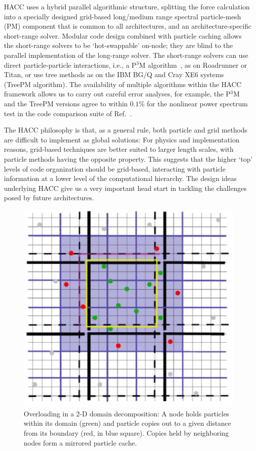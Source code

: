 HACC uses a hybrid parallel algorithmic structure, splitting the force
calculation into a specially designed grid-based long/medium range
spectral particle-mesh (PM) component that is common to all
architectures, and an architecture-specific short-range
solver. Modular code design combined with particle caching allows the
short-range solvers to be `hot-swappable' on-node; they are blind to
the parallel implementation of the long-range solver. 
The short-range solvers can use direct particle-particle interactions, i.e., a P$^3$M
algorithm~\cite{hockney}, as on Roadrunner or Titan, or use tree
methods as on the IBM BG/Q and Cray XE6 systems (TreePM
algorithm). The availability of multiple algorithms within the HACC
framework allows us to carry out careful error analyses, for example,
the P$^3$M and the TreePM versions agree to within $0.1\%$ for the
nonlinear power spectrum test in the code comparison suite of
Ref.~\cite{heitmann05}.

The HACC philosophy is that, as a general rule, both particle and grid
methods are difficult to implement as global solutions: For physics
and implementation reasons, grid-based techniques are better suited to
larger length scales, with particle methods having the opposite
property. This suggests that the higher `top' levels of code
organization should be grid-based, interacting with particle
information at a lower level of the computational hierarchy. The
design ideas underlying HACC give us a very important head start in
tackling the challenges posed by future architectures.

\begin{figure}
\includegraphics[width=0.5\columnwidth]{../Plots/overload}
\caption{ Overloading in a 2-D domain decomposition: A node
    holds particles within its domain (green) and particle copies out
    to a given distance from its boundary (red, in blue
    square). Copies held by neighboring nodes form a mirrored particle
    cache.}
\label{overload}
\end{figure}
\noindent



